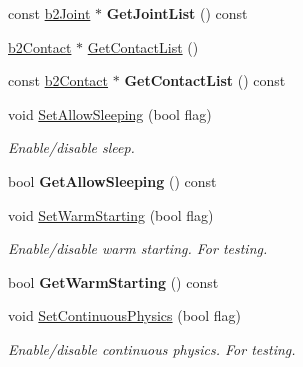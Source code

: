 \begin{DoxyCompactItemize}
const \mbox{\hyperlink{classb2Joint}{b2\+Joint}} $\ast$ {\bfseries Get\+Joint\+List} () const
\item 
\mbox{\hyperlink{classb2Contact}{b2\+Contact}} $\ast$ \mbox{\hyperlink{classb2World_ab1e1c59fd7534c0268c2a3e31370a425}{Get\+Contact\+List}} ()
\item 
\mbox{\label{classb2World_a8a947dbda196b037b922d62e6a54062f}} 
const \mbox{\hyperlink{classb2Contact}{b2\+Contact}} $\ast$ {\bfseries Get\+Contact\+List} () const
\item 
\mbox{\label{classb2World_a6755872564fc3db70c69d2b9d349fa33}} 
void \mbox{\hyperlink{classb2World_a6755872564fc3db70c69d2b9d349fa33}{Set\+Allow\+Sleeping}} (bool flag)
\begin{DoxyCompactList}\small\item\em Enable/disable sleep. \end{DoxyCompactList}\item 
\mbox{\label{classb2World_a3d7ce9b87a54fb4f84433f6223d81175}} 
bool {\bfseries Get\+Allow\+Sleeping} () const
\item 
\mbox{\label{classb2World_a8e8c12142e8c4884a18787926a261359}} 
void \mbox{\hyperlink{classb2World_a8e8c12142e8c4884a18787926a261359}{Set\+Warm\+Starting}} (bool flag)
\begin{DoxyCompactList}\small\item\em Enable/disable warm starting. For testing. \end{DoxyCompactList}\item 
\mbox{\label{classb2World_af23e93dbf44ebfc3c7ce9dfdc00b8ff7}} 
bool {\bfseries Get\+Warm\+Starting} () const
\item 
\mbox{\label{classb2World_a536dd9181c2e20096073e3cfe2c8530a}} 
void \mbox{\hyperlink{classb2World_a536dd9181c2e20096073e3cfe2c8530a}{Set\+Continuous\+Physics}} (bool flag)
\begin{DoxyCompactList}\small\item\em Enable/disable continuous physics. For testing. \end{DoxyCompactList}\item 
\mbox{\label{classb2World_afec853cfec7a8bbffc20d4acc99963e7}} 

\end{DoxyCompactItemize}
